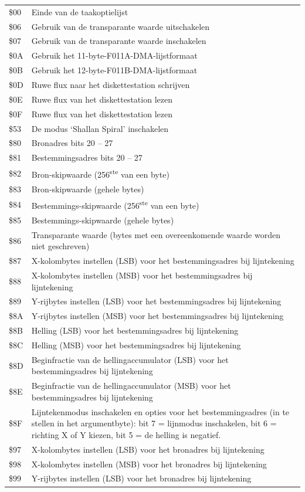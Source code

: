 \begin{center}
\begin{tabular}{|>{\centering\arraybackslash}p{1.5cm}|p{10cm}|}
  \hline
\$00 & Einde van de taakoptielijst \\  \$06 & Gebruik van de transparante waarde uitschakelen \\  \$07 & Gebruik van de transparante waarde inschakelen \\  \$0A & Gebruik het 11-byte-F011A-DMA-lijstformaat \\  \$0B & Gebruik het 12-byte-F011B-DMA-lijstformaat \\  \$0D & Ruwe flux naar het diskettestation schrijven \\  \$0E & Ruwe flux van het diskettestation lezen \\  \$0F & Ruwe flux van het diskettestation lezen \\  \$53 & De modus `Shallan Spiral' inschakelen \\  \$80 & Bronadres bits 20 -- 27 \\  \$81 & Bestemmingsadres bits 20 -- 27 \\  \$82 & Bron-skipwaarde (256\textsuperscript{ste} van een byte) \\  \$83 & Bron-skipwaarde (gehele bytes) \\  \$84 & Bestemmings-skipwaarde (256\textsuperscript{ste} van een byte) \\  \$85 & Bestemmings-skipwaarde (gehele bytes) \\  \$86 & Transparante waarde (bytes met een overeenkomende waarde worden niet geschreven) \\  \$87 & X-kolombytes instellen (LSB) voor het bestemmingsadres bij lijntekening \\  \$88 & X-kolombytes instellen (MSB) voor het bestemmingsadres bij lijntekening \\  \$89 & Y-rijbytes instellen (LSB) voor het bestemmingsadres bij lijntekening \\  \$8A & Y-rijbytes instellen (MSB) voor het bestemmingsadres bij lijntekening \\  \$8B & Helling (LSB) voor het bestemmingsadres bij lijntekening \\  \$8C & Helling (MSB) voor het bestemmingsadres bij lijntekening \\  \$8D & Beginfractie van de hellingaccumulator (LSB) voor het bestemmingsadres bij lijntekening \\  \$8E & Beginfractie van de hellingaccumulator (MSB) voor het bestemmingsadres bij lijntekening \\  \$8F & Lijntekenmodus inschakelen en opties voor het bestemmingsadres (in te stellen in het argumentbyte): bit 7 = lijnmodus inschakelen, bit 6 = richting X of Y kiezen, bit 5 = de helling is negatief. \\  \$97 & X-kolombytes instellen (LSB) voor het bronadres bij lijntekening \\  \$98 & X-kolombytes instellen (MSB) voor het bronadres bij lijntekening \\  \$99 & Y-rijbytes instellen (LSB) voor het bronadres bij lijntekening \\  
\end{tabular}
\end{center}
